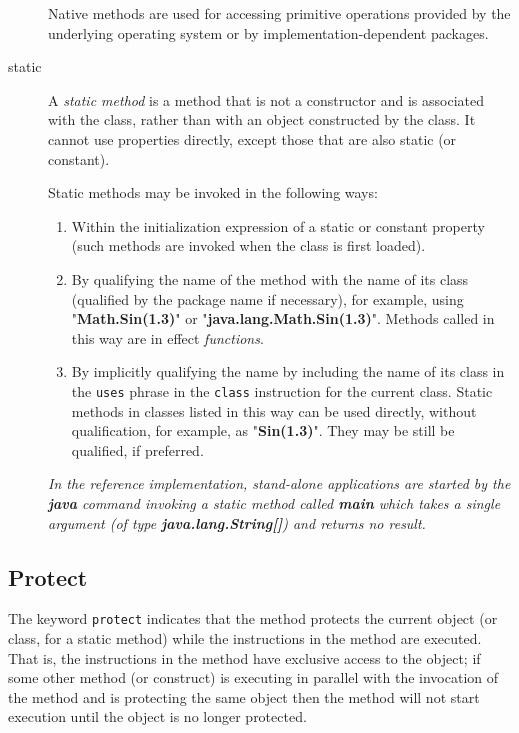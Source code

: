 \begin{description}
Native methods are used for accessing primitive operations provided by
the underlying operating system or by implementation-dependent packages.
\index{,}
\index{,}
\item[static]\label{refstatmet}

A \emph{static method} is a method that is not a constructor and is
associated with the class, rather than with an object constructed by the
class.
It cannot use properties directly, except those that are also static (or
constant).
 
Static methods may be invoked in the following ways:
\begin{enumerate}
\item Within the initialization expression of a static or constant
property (such methods are invoked when the class is first loaded).
\item By qualifying the name of the method with the name of its class
(qualified by the package name if necessary), for example, using
"\textbf{Math.Sin(1.3)}" or
"\textbf{java.lang.Math.Sin(1.3)}".
Methods called in this way are in effect \emph{functions}.
\item 
By implicitly qualifying the name by including the name of its class
in the \texttt{uses} phrase in the \texttt{class} instruction for the
current class.  Static methods in classes listed in this way can be used
directly, without qualification, for example, as
"\textbf{Sin(1.3)}".
They may be still be qualified, if preferred.
\end{enumerate}
 \emph{In the reference implementation, stand-alone applications are
started by the \textbf{java} command invoking a static method
called \textbf{main} which takes a single argument (of
type \textbf{java.lang.String[]}) and returns no result.
}
\end{description}
\subsection{Protect}
 
The keyword \texttt{protect} indicates that the method protects the
current object (or class, for a static method) while the instructions
in the method are executed.
That is, the instructions in the method have exclusive access to the
object; if some other method (or construct) is executing in
parallel with the invocation of the method and is protecting the same
object then the method will not start execution until the object is no
longer protected.
 
